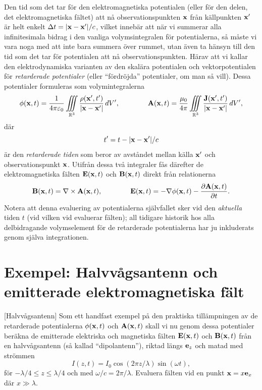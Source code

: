 \noindent
Den tid som det tar f{\"o}r den elektromagnetiska potentialen (eller f{\"o}r
den delen, det elektromagnetiska f{\"a}ltet) att n{\aa} observationspunkten
${\bf x}$ fr{\aa}n k{\"a}llpunkten ${\bf x}'$ {\"a}r helt enkelt
$\Delta t = |{\bf x}-{\bf x}'|/c$, vilket inneb{\"a}r att n{\"a}r vi summerar
alla infinitesimala bidrag i den vanliga volymsintegralen f{\"o}r potentialerna,
s{\aa} m{\aa}ste vi vara noga med att inte bara summera {\"o}ver rummet, utan
{\"a}ven ta h{\"a}nsyn till den tid som det tar f{\"o}r potentialen att n{\aa}
observationspunkten. H{\"a}rav att vi kallar den elektrodynamiska varianten av
den skal{\"a}ra potentialen och vektorpotentialen f{\"o}r {\it retarderade
potentialer} (eller ``f{\"o}rdr{\"o}jda'' potentialer, om man s{\aa} vill).
Dessa potentialer formuleras som volymintegralerna
$$
  \phi({\bf x},t)={{1}\over{4\pi\varepsilon_0}}\iiint_{{\Bbb R}^3}
    {{\rho({\bf x}',t')}\over{|{\bf x}-{\bf x}'|}}\,dV',\qquad\qquad
  {\bf A}({\bf x},t)={{\mu_0}\over{4\pi}}\iiint_{{\Bbb R}^3}
    {{{\bf J}({\bf x}',t')}\over{|{\bf x}-{\bf x}'|}}\,dV',
$$
d{\"a}r
$$
  t' = t - |{\bf x}-{\bf x}'|/c
$$
{\"a}r den {\it retarderade tiden} som beror av avst{\aa}ndet mellan k{\"a}lla
${\bf x}'$ och observationspunkt ${\bf x}$. Utifr{\aa}n dessa tv{\aa} integraler
f{\aa}s d{\"a}refter de elektromagnetiska f{\"a}lten ${\bf E}({\bf x},t)$ och
${\bf B}({\bf x},t)$ direkt fr{\aa}n relationerna
$$
  {\bf B}({\bf x},t)=\nabla\times{\bf A}({\bf x},t),\qquad\qquad
  {\bf E}({\bf x},t)
    =-\nabla\phi({\bf x},t)-{{\partial{\bf A}({\bf x},t)}\over{\partial t}}.
$$
Notera att denna evaluering av potentialerna sj{\"a}lvfallet sker vid den
{\it aktuella} tiden $t$ (vid vilken vid evaluerar f{\"a}lten); all tidigare
historik hos alla delbidragande volymselement f{\"o}r de retarderade
potentialerna har ju inkluderats genom sj{\"a}lva integrationen.
\vfill\eject

\section{Exempel: Halvv{\aa}gsantenn och emitterade elektromagnetiska f{\"a}lt}
[Halvv{\aa}gsantenn]
Som ett handfast exempel p{\aa} den praktiska till{\"a}mpningen av de
retarderade potentialerna $\phi({\bf x},t)$ och ${\bf A}({\bf x},t)$ skall vi
nu genom dessa potentialer ber{\"a}kna de emitterade elektriska och magnetiska
f{\"a}lten ${\bf E}({\bf x},t)$ och ${\bf B}({\bf x},t)$ fr{\aa}n en
halvv{\aa}gsantenn (s{\aa} kallad ``dipolantenn''), riktad l{\"a}ngs
${\bf e}_z$ och matad med str{\"o}mmen
$$
  I(z,t) = I_0\cos(2\pi z/\lambda)\sin(\omega t),
$$
f{\"o}r $-\lambda/4\le z\le \lambda/4$ och med $\omega/c=2\pi/\lambda$.
Evaluera f{\"a}lten vid en punkt ${\bf x}=x{\bf e}_x$ d{\"a}r $x\gg\lambda$.

